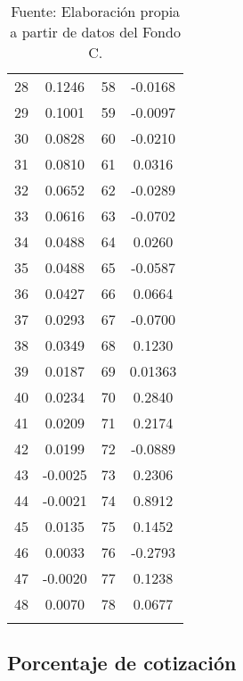 \documentclass[
]{article}
\begin{document}
\begin{longtable}{|c|c|c|c|}
  28 & 0.1246 & 58 & -0.0168 \\

  29 & 0.1001 & 59 & -0.0097 \\

  30 & 0.0828 & 60 & -0.0210 \\

  31 & 0.0810 & 61 & 0.0316 \\

  32 & 0.0652 & 62 & -0.0289 \\

  33 & 0.0616 & 63 & -0.0702 \\

  34 & 0.0488 & 64 & 0.0260 \\

  35 & 0.0488 & 65 & -0.0587 \\

  36 & 0.0427 & 66 & 0.0664 \\

  37 & 0.0293 & 67 & -0.0700 \\

  38 & 0.0349 & 68 & 0.1230 \\

  39 & 0.0187 & 69 & 0.01363 \\

  40 & 0.0234 & 70 & 0.2840 \\

  41 & 0.0209 & 71 & 0.2174 \\

  42 & 0.0199 & 72 & -0.0889 \\

  43 & -0.0025 & 73 & 0.2306 \\

  44 & -0.0021 & 74 & 0.8912 \\

  45 & 0.0135 & 75 & 0.1452 \\

  46 & 0.0033 & 76 & -0.2793 \\

  47 & -0.0020 & 77 & 0.1238 \\

  48 & 0.0070 & 78 & 0.0677 \\
  \hline
  
    \caption*{Fuente: Elaboración propia a partir de datos del Fondo C.} 
\end{longtable}

\subsection{Porcentaje de cotización}\label{porcentaje-de-cotizaciuxf3n}
\end{document}
